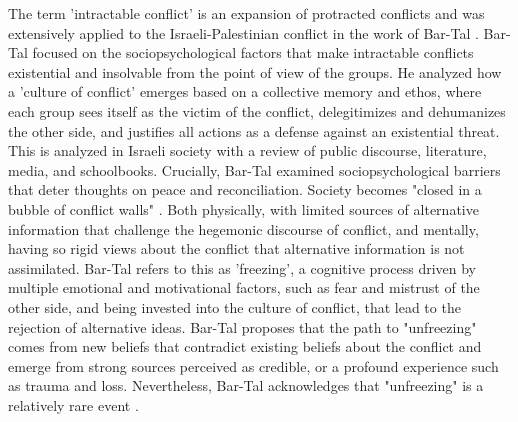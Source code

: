 \documentclass[dissertation,math,vertlayout,pdfa,colorlinks]{aaltoseries}
\begin{document}
The term 'intractable conflict' \cite{kriesbergIntractableConflicts1993} is an expansion of protracted conflicts and was extensively applied to the Israeli-Palestinian conflict in the work of Bar-Tal \cite{bar-talIntractableConflictsSociopsychological2013}. Bar-Tal focused on the sociopsychological factors that make intractable conflicts existential and insolvable from the point of view of the groups. He analyzed how a 'culture of conflict' emerges based on a collective memory and ethos, where each group sees itself as the victim of the conflict, delegitimizes and dehumanizes the other side, and justifies all actions as a defense against an existential threat. This is analyzed in Israeli society with a review of public discourse, literature, media, and schoolbooks. Crucially, Bar-Tal examined sociopsychological barriers that deter thoughts on peace and reconciliation. Society becomes "closed in a bubble of conflict walls" \cite[p. 281]{bar-talIntractableConflictsSociopsychological2013}. Both physically, with limited sources of alternative information that challenge the hegemonic discourse of conflict, and mentally, having so rigid views about the conflict that alternative information is not assimilated. Bar-Tal refers to this as 'freezing', a cognitive process driven by multiple emotional and motivational factors, such as fear and mistrust of the other side, and being invested into the culture of conflict, that lead to the rejection of alternative ideas. Bar-Tal proposes that the path to "unfreezing" comes from new beliefs that contradict existing beliefs about the conflict and emerge from strong sources perceived as credible, or a profound experience such as trauma and loss. Nevertheless, Bar-Tal acknowledges that "unfreezing" is a relatively rare event \cite[p. 289]{bar-talIntractableConflictsSociopsychological2013}. 
\end{document}
